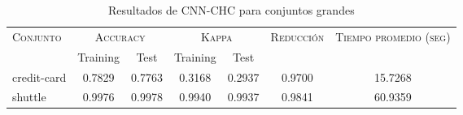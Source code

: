 \begin{table}[]
\centering
\begin{tabular}{l c c c c c c}
\hline
\multirow{2}{*}{\textsc{Conjunto}}
	& \multicolumn{2}{c}{\textsc{Accuracy}}
	& \multicolumn{2}{c}{\textsc{Kappa}}
	& \textsc{Reducción}
	& \textsc{Tiempo promedio (seg)} \\
	& Training & Test
	& Training & Test \\ 
\hline
\hline

credit-card & 0.7829 & 0.7763 & 0.3168 & 0.2937 & 0.9700 & 15.7268 \\
shuttle & 0.9976 & 0.9978 & 0.9940 & 0.9937 & 0.9841 & 60.9359 \\

\hline
\end{tabular}
\caption{Resultados de CNN-CHC para conjuntos grandes }
\label{res-grande-CNN-CHC}
\end{table}


